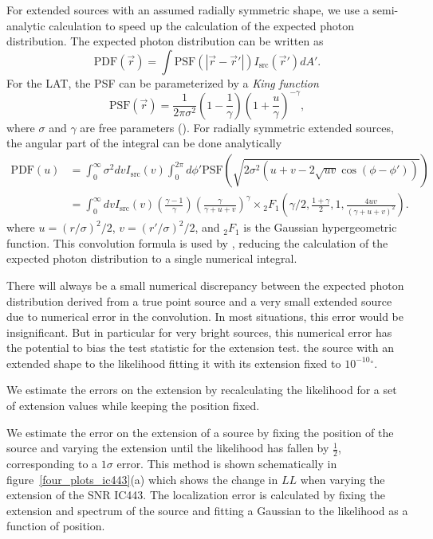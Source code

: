 \documentclass[12pt,preprint]{aastex}
\newcommand{\loglikelihood}{\ensuremath{LL}\xspace}
\renewcommand{\deg}{\ensuremath{^\circ}\xspace}
\newcommand{\pointlike}{\text{\em pointlike}\xspace}
\begin{document}
For extended sources with an assumed radially symmetric shape,
we use a semi-analytic calculation to speed up the calculation of
the expected photon distribution. The expected photon 
distribution can be written as
\begin{equation}
  \text{PDF}(\vec r) = \int  \text{PSF}(|\vec r - \vec r'|)I_\text{src}(\vec r') d A'.
\end{equation}
For the LAT, the PSF can be parameterized by a {\em King function}
\begin{equation}
  \text{PSF}(\vec r) = 
  \frac{1}{2\pi\sigma^2}
  \left(1-\frac{1}{\gamma}\right)
  \left(1+\frac{u}{\gamma}\right)^{-\gamma},
\end{equation}
where $\sigma$ and $\gamma$ are free parameters
(\cite{matthew_kerr_thesis}).  For radially symmetric extended sources,
the angular part of the integral can be done analytically
\begin{align}
  \text{PDF}(u) & = \int_0^\infty \sigma^2 dv 
  I_\text{src}(v) 
  \int_0^{2\pi} d\phi' 
  \text{PSF}(\sqrt{2\sigma^2(u+v-2\sqrt{uv}\cos(\phi-\phi'))})
  \\
  & = \int_0^\infty dv
  I_\text{src}(v) 
  \left(\frac{\gamma-1}{\gamma}\right)
  \left( \frac{\gamma}{\gamma + u + v}\right)^\gamma 
  \times {}_2F_1 \left(\gamma/2,\frac{1+\gamma}{2},1,\frac{4uv}{(\gamma+u+v)^2}\right).
\end{align}
where $u=(r/\sigma)^2/2$, $v=(r'/\sigma)^2/2$, and ${}_2F_1$ is the
Gaussian hypergeometric function.  This convolution formula is used by
\pointlike, reducing the calculation of the expected photon distribution
to a single numerical integral.

There will always be a small numerical discrepancy between the expected
photon distribution derived from a true point source and a very small
extended source due to numerical error in the convolution.  In most
situations, this error would be insignificant.  But in particular for
very bright sources, this numerical error has the potential to bias the
test statistic for the extension test.  the source with an extended shape
to the likelihood fitting it with its extension fixed to ${10^{-10}}\deg$.

We estimate the errors on the extension
by recalculating the likelihood for a set of extension values
while keeping the position fixed.

We estimate the error on the extension of a source by fixing the position
of the source and varying the extension until the likelihood has fallen
by $\tfrac{1}{2}$, corresponding to a $1\sigma$ error.  This method is
shown schematically in figure~\ref{four_plots_ic443}(a) which shows the
change in \loglikelihood when varying the extension of the SNR IC443.
The localization error is calculated by fixing the extension and spectrum
of the source and fitting a Gaussian to the likelihood as a function
of position.
\end{document}
